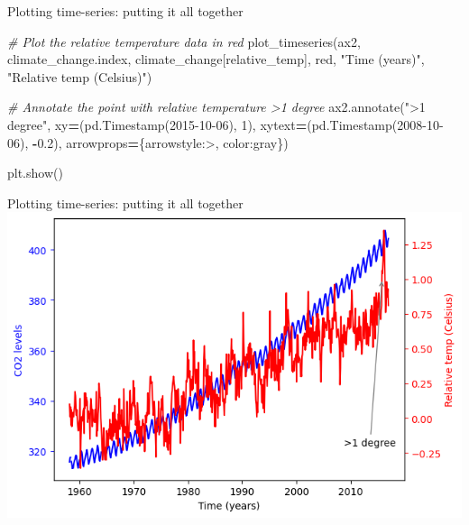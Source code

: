 \documentclass[
  ignorenonframetext,
]{beamer}
\newenvironment{Shaded}{\begin{snugshade}}{\end{snugshade}}
\newcommand{\CommentTok}[1]{\textcolor[rgb]{0.56,0.35,0.01}{\textit{#1}}}
\newcommand{\DecValTok}[1]{\textcolor[rgb]{0.00,0.00,0.81}{#1}}
\newcommand{\FloatTok}[1]{\textcolor[rgb]{0.00,0.00,0.81}{#1}}
\newcommand{\NormalTok}[1]{#1}
\newcommand{\OperatorTok}[1]{\textcolor[rgb]{0.81,0.36,0.00}{\textbf{#1}}}
\newcommand{\StringTok}[1]{\textcolor[rgb]{0.31,0.60,0.02}{#1}}
\begin{document}
\begin{frame}[fragile]{Plotting time-series: putting it all together}
\label{plotting-time-series-putting-it-all-together-5}

\begin{Shaded}
\begin{Highlighting}[]

\CommentTok{\# Plot the relative temperature data in red}
\NormalTok{plot\_timeseries(ax2, climate\_change.index, climate\_change[}\StringTok{\textquotesingle{}relative\_temp\textquotesingle{}}\NormalTok{], }\StringTok{\textquotesingle{}red\textquotesingle{}}\NormalTok{, }\StringTok{"Time (years)"}\NormalTok{, }\StringTok{"Relative temp (Celsius)"}\NormalTok{)}

\CommentTok{\# Annotate the point with relative temperature \textgreater{}1 degree}
\NormalTok{ax2.annotate(}\StringTok{"\textgreater{}1 degree"}\NormalTok{, xy}\OperatorTok{=}\NormalTok{(pd.Timestamp(}\StringTok{\textquotesingle{}2015{-}10{-}06\textquotesingle{}}\NormalTok{), }\DecValTok{1}\NormalTok{), xytext}\OperatorTok{=}\NormalTok{(pd.Timestamp(}\StringTok{\textquotesingle{}2008{-}10{-}06\textquotesingle{}}\NormalTok{), }\OperatorTok{{-}}\FloatTok{0.2}\NormalTok{), arrowprops}\OperatorTok{=}\NormalTok{\{}\StringTok{\textquotesingle{}arrowstyle\textquotesingle{}}\NormalTok{:}\StringTok{\textquotesingle{}{-}\textgreater{}\textquotesingle{}}\NormalTok{, }\StringTok{\textquotesingle{}color\textquotesingle{}}\NormalTok{:}\StringTok{\textquotesingle{}gray\textquotesingle{}}\NormalTok{\})}

\NormalTok{plt.show()}
\end{Highlighting}
\end{Shaded}
\end{frame}

\begin{frame}{Plotting time-series: putting it all together}
\label{plotting-time-series-putting-it-all-together-6}
\includegraphics{../images/im239.png}
\end{frame}
\end{document}
